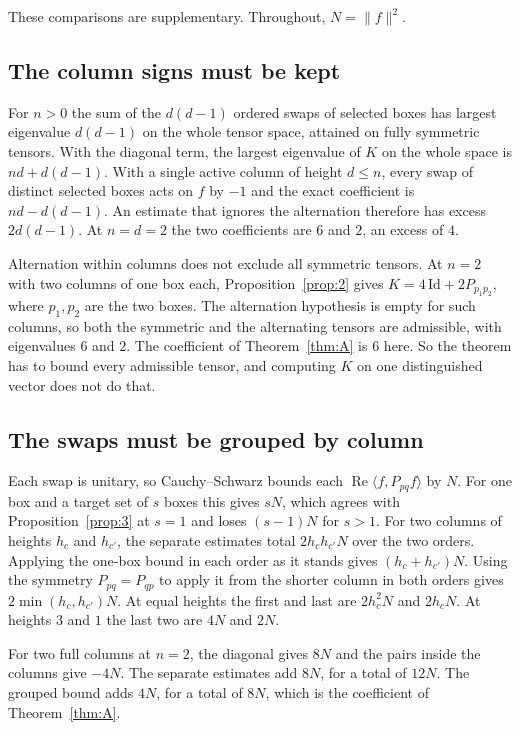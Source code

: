 \documentclass[11pt]{amsart}
\newcommand{\notlean}{supplementary}
\theoremstyle{definition}
\theoremstyle{remark}
\begin{document}
These comparisons are \notlean. Throughout, \(N=\|f\|^2\).

\subsection{The column signs must be kept}

For \(n>0\) the sum of the \(d(d-1)\) ordered swaps of selected boxes has
largest eigenvalue \(d(d-1)\) on the whole tensor space, attained on fully
symmetric tensors. With the diagonal term, the largest eigenvalue of \(K\) on
the whole space is \(nd+d(d-1)\). With a single active column of height
\(d\le n\), every swap of distinct selected boxes acts on \(f\) by \(-1\) and
the exact coefficient is \(nd-d(d-1)\). An estimate that ignores the
alternation therefore has excess \(2d(d-1)\). At \(n=d=2\) the two
coefficients are \(6\) and \(2\), an excess of \(4\).

Alternation within columns does not exclude all symmetric tensors. At
\(n=2\) with two columns of one box each, Proposition~\ref{prop:2} gives
\(K=4\,\mathrm{Id}+2P_{p_1p_2}\), where \(p_1,p_2\) are the two boxes. The
alternation hypothesis is empty for such columns, so both the symmetric and
the alternating tensors are admissible, with eigenvalues \(6\) and \(2\). The
coefficient of Theorem~\ref{thm:A} is \(6\) here. So the theorem has to bound
every admissible tensor, and computing \(K\) on one distinguished vector does
not do that.

\subsection{The swaps must be grouped by column}

Each swap is unitary, so Cauchy--Schwarz bounds each
\(\operatorname{Re}\langle f,P_{pq}f\rangle\) by \(N\). For one box and a
target set of \(s\) boxes this gives \(sN\), which agrees with
Proposition~\ref{prop:3} at \(s=1\) and loses \((s-1)N\) for \(s>1\). For two
columns of heights \(h_c\) and \(h_{c'}\), the separate estimates total
\(2h_ch_{c'}N\) over the two orders. Applying the one-box bound in each order
as it stands gives \((h_c+h_{c'})N\). Using the symmetry \(P_{pq}=P_{qp}\) to
apply it from the shorter column in both orders gives
\(2\min(h_c,h_{c'})N\). At equal heights the first and last are \(2h_c^2N\)
and \(2h_cN\). At heights \(3\) and \(1\) the last two are \(4N\) and \(2N\).

For two full columns at \(n=2\), the diagonal gives \(8N\) and the pairs
inside the columns give \(-4N\). The separate estimates add \(8N\), for a
total of \(12N\). The grouped bound adds \(4N\), for a total of \(8N\), which
is the coefficient of Theorem~\ref{thm:A}.
\end{document}
